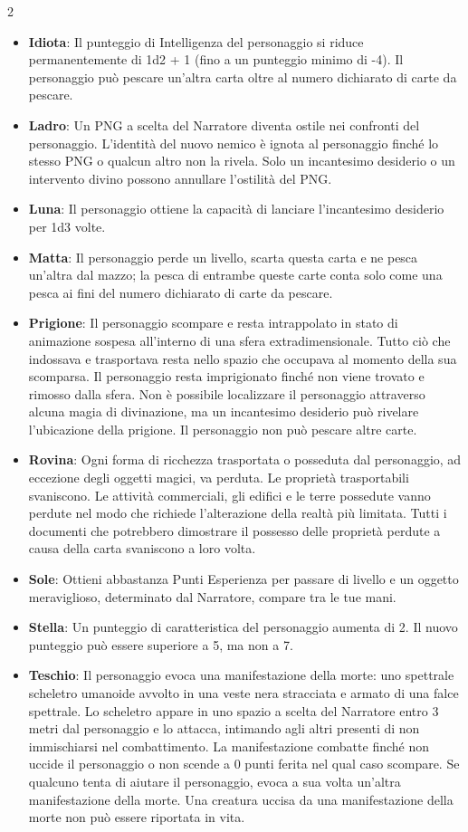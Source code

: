 \begin{multicols}{2}
\begin{itemize}[leftmargin=*]
\item \textbf{Idiota}: Il punteggio di Intelligenza del personaggio si riduce permanentemente di 1d2 + 1 (fino a un punteggio minimo di -4). Il personaggio può pescare un’altra carta oltre al numero dichiarato di carte da pescare.
\item \textbf{Ladro}: Un PNG a scelta del Narratore diventa ostile nei confronti del personaggio. L'identità del nuovo nemico è ignota al personaggio finché lo stesso PNG o qualcun altro non la rivela. Solo un incantesimo desiderio o un intervento divino possono annullare l’ostilità del PNG.
\item \textbf{Luna}: Il personaggio ottiene la capacità di lanciare l'incantesimo desiderio per 1d3 volte.
\item \textbf{Matta}: Il personaggio perde un livello, scarta questa carta e ne pesca un’altra dal mazzo; la pesca di entrambe queste carte conta solo come una pesca ai fini del numero dichiarato di carte da pescare.
\item \textbf{Prigione}: Il personaggio scompare e resta intrappolato in stato di animazione sospesa all’interno di una sfera extradimensionale. Tutto ciò che indossava e trasportava resta nello spazio che occupava al momento della sua scomparsa. Il personaggio resta imprigionato finché non viene trovato e rimosso dalla sfera. Non è possibile localizzare il personaggio attraverso alcuna magia di divinazione, ma un incantesimo desiderio può rivelare l’ubicazione della prigione. Il personaggio non può pescare altre carte.
\item \textbf{Rovina}: Ogni forma di ricchezza trasportata o posseduta dal personaggio, ad eccezione degli oggetti magici, va perduta. Le proprietà trasportabili svaniscono. Le attività commerciali, gli edifici e le terre possedute vanno perdute nel modo che richiede l'alterazione della realtà più limitata. Tutti i documenti che potrebbero dimostrare il possesso delle proprietà perdute a causa della carta svaniscono a loro volta.
\item \textbf{Sole}: Ottieni abbastanza Punti Esperienza per passare di livello e un oggetto meraviglioso, determinato dal Narratore, compare tra le tue mani.
\item \textbf{Stella}: Un punteggio di caratteristica del personaggio aumenta di 2. Il nuovo punteggio può essere superiore a 5, ma non a 7.
\item \textbf{Teschio}: Il personaggio evoca una manifestazione della morte: uno spettrale scheletro umanoide avvolto in una veste nera stracciata e armato di una falce spettrale. Lo scheletro appare in uno spazio a scelta del Narratore entro 3 metri dal personaggio e lo attacca, intimando agli altri presenti di non immischiarsi nel combattimento. La manifestazione combatte finché non uccide il personaggio o non scende a 0 punti ferita nel qual caso scompare. Se qualcuno tenta di aiutare il personaggio, evoca a sua volta un'altra manifestazione della morte. Una creatura uccisa da una manifestazione della morte non può essere riportata in vita.

\end{itemize}
\end{multicols}
